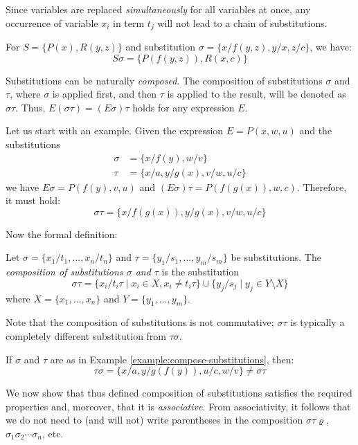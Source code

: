 Since variables are replaced \emph{simultaneously} for all variables at once, any occurrence of variable $x_i$ in term $t_j$ will not lead to a chain of substitutions.

\begin{example}
For $S=\{P(x),R(y,z)\}$ and substitution $\sigma=\{x/f(y,z),y/x,z/c\}$, we have:
$$
S\sigma=\{P(f(y,z)),R(x,c)\}
$$
\end{example}

Substitutions can be naturally \emph{composed}. The composition of substitutions $\sigma$ and $\tau$, where $\sigma$ is applied first, and then $\tau$ is applied to the result, will be denoted as $\sigma\tau$. Thus, $E(\sigma\tau)=(E\sigma)\tau$ holds for any expression $E$.

\begin{example}\label{example:compose-substitutions}
    Let us start with an example. Given the expression $E=P(x,w,u)$ and the substitutions \begin{align*}
        \sigma&=\{x/f(y),w/v\}\\
        \tau&=\{x/a,y/g(x),v/w,u/c\}
    \end{align*}
    we have $E\sigma=P(f(y),v,u)$ and $(E\sigma)\tau=P(f(g(x)),w,c)$.
    Therefore, it must hold: 
    $$
    \sigma\tau=\{x/f(g(x)),y/g(x),v/w,u/c\}
    $$
\end{example}

Now the formal definition:

\begin{definition}
Let $\sigma=\{x_1/t_1,\dots,x_n/t_n\}$ and $\tau=\{y_1/s_1,\dots,y_m/s_m\}$ be substitutions. The \emph{composition of substitutions $\sigma$ and $\tau$} is the substitution
$$
\sigma\tau=\{x_i/t_i\tau\mid x_i\in X,x_i\neq t_i\tau\}\cup\{y_j/s_j\mid y_j\in Y\setminus X\}
$$
where $X=\{x_1,\dots,x_n\}$ and $Y=\{y_1,\dots,y_m\}$.
\end{definition}

Note that the composition of substitutions is not commutative; $\sigma\tau$ is typically a completely different substitution from $\tau\sigma$.

\begin{example}
    If $\sigma$ and $\tau$ are as in Example \ref{example:compose-substitutions}, then: 
    $$
    \tau\sigma=\{x/a,y/g(f(y)),u/c,w/v\}\neq \sigma\tau
    $$
\end{example}

We now show that thus defined composition of substitutions satisfies the required properties and, moreover, that it is \emph{associative}. From associativity, it follows that we do not need to (and will not) write parentheses in the composition $\sigma\tau\varrho$, $\sigma_1\sigma_2\cdots\sigma_n$, etc.

